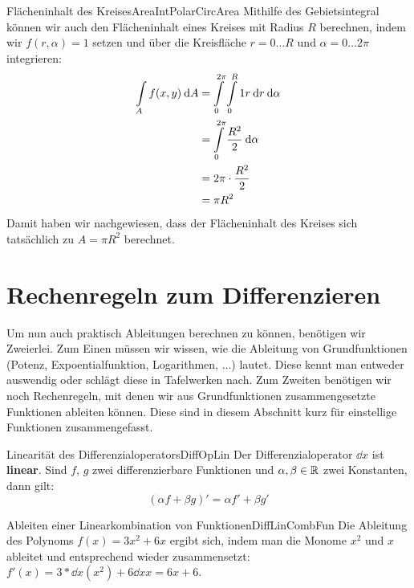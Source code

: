 \begin{example}{Flächeninhalt des Kreises}{AreaIntPolarCircArea}
    Mithilfe des Gebietsintegral können wir auch den Flächeninhalt eines Kreises mit Radius $R$ berechnen, indem wir $f(r,\alpha) = 1$ setzen und über die Kreisfläche $r=0\dots R$ und $\alpha = 0\dots 2\pi$ integrieren:
    \begin{alignat*}{1}
        \int\limits_{A} f(x,y) \:\mathrm{d}{A} &= \int\limits_0^{2\pi} \int\limits_0^R 1 r \:\mathrm{d}{r} \:\mathrm{d}{\alpha}  \\
                                        &= \int\limits_0^{2\pi} \frac{R^2}{2} \:\mathrm{d}{\alpha} \\
                                        &= 2\pi \cdot \frac{R^2}{2} \\
                                        &= \pi R^2
    \end{alignat*}
    Damit haben wir nachgewiesen, dass der Flächeninhalt des Kreises sich tatsächlich zu $A =\pi R^2$ berechnet.
\end{example}

\section{Rechenregeln zum Differenzieren}

Um nun auch praktisch Ableitungen berechnen zu können, benötigen wir Zweierlei. Zum Einen müssen wir wissen, wie die Ableitung von Grundfunktionen (Potenz, Expoentialfunktion, Logarithmen, $\dots$) lautet. Diese kennt man entweder auswendig oder schlägt diese in Tafelwerken nach. Zum Zweiten benötigen wir noch Rechenregeln, mit denen wir aus Grundfunktionen zusammengesetzte Funktionen ableiten können. Diese sind in diesem Abschnitt kurz für einstellige Funktionen zusammengefasst.

\begin{statement}{Linearität des Differenzialoperators}{DiffOpLin}
    Der Differenzialoperator $\dd{}{x}$ ist \textbf{linear}. Sind $f$, $g$ zwei differenzierbare Funktionen und $\alpha,\beta\in\mathbb{R}$ zwei Konstanten, dann gilt:
    $$
        (\alpha f + \beta g)' = \alpha f' + \beta g'
    $$
\end{statement}

\begin{example}{Ableiten einer Linearkombination von Funktionen}{DiffLinCombFun}
    Die Ableitung des Polynoms $f(x) = 3x^2+6x$ ergibt sich, indem man die Monome $x^2$ und $x$ ableitet und entsprechend wieder zusammensetzt: $f'(x) = 3 * \dd{}{x} (x^2) + 6 \dd{}{x} x = 6x +6$.
\end{example}

